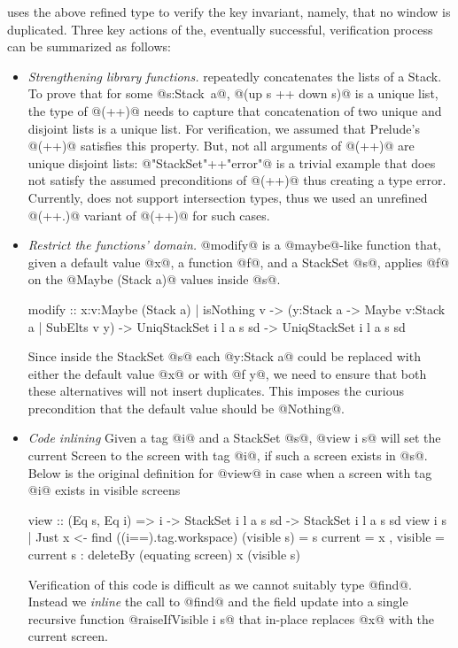 \toolname uses the above refined type to verify the key invariant,
namely, that no window is duplicated.
%
%
Three key actions of the, eventually successful, verification process
can be summarized as follows:
\begin{itemize}
\item\emph{Strengthening library functions.} 
  \lbxmonad repeatedly concatenates the lists of a Stack. %
  To prove that for some \hbox{@s:Stack a@,} @(up s ++ down s)@ is a unique list,
  the type of @(++)@ needs to capture that concatenation of two unique and
  disjoint lists is a unique list.
  For verification, we assumed that Prelude's @(++)@ satisfies this property.
  But, not all arguments of @(++)@ are unique disjoint lists:
  @"StackSet"++"error"@ is a trivial example that does not satisfy
  the assumed preconditions of @(++)@ thus creating a type error.
  Currently, \toolname does not support intersection types, 
  thus we used an unrefined @(++.)@ variant of @(++)@ for such cases.
     
\item\emph{Restrict the functions' domain.}
  @modify@ is a @maybe@-like function that, given a default value @x@,
  a function @f@, and a StackSet @s@, applies @f@ on the @Maybe (Stack a)@
  values inside @s@. 
\begin{code}
modify :: x:{v:Maybe (Stack a) | isNothing v}
       -> (y:Stack a 
           -> Maybe {v:Stack a | SubElts v y})
       -> UniqStackSet i l a s sd 
       -> UniqStackSet i l a s sd
\end{code}
        Since inside the StackSet @s@ each @y:Stack a@ could be replaced
    with either the default value @x@ or with @f y@, we need to
    ensure that both these alternatives will not insert duplicates.
	This imposes the curious precondition that the default
	value should be @Nothing@.

			
	\item\emph{Code inlining}
    Given a tag @i@ and a StackSet @s@,  @view i s@ will set the current Screen 
    to the screen with tag @i@, if such a screen exists in @s@.
    Below is the original definition for @view@ in case when a screen with tag 
    @i@ exists in visible screens
\begin{code}
view :: (Eq s, Eq i) => i 
     -> StackSet i l a s sd 
     -> StackSet i l a s sd
view i s    
  | Just x <- find ((i==).tag.workspace) 
                     (visible s)
  = s { current = x
      , visible = current s 
                : deleteBy (equating screen) x 
                           (visible s) } 
\end{code}
    Verification of this code is difficult as we cannot suitably type @find@. 
    Instead we \emph{inline} the call to @find@ and the field update into a 
    single recursive function @raiseIfVisible i s@ that in-place replaces @x@ 
    with the current screen.  
\end{itemize}

